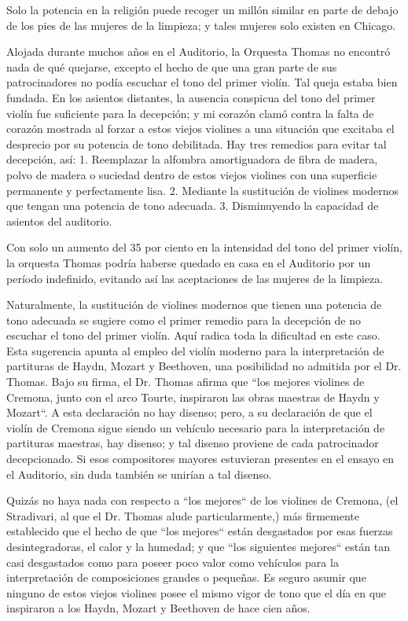 \documentclass[12pt]{book}
\begin{document}
Solo la potencia en la religión puede recoger un millón similar en parte de debajo de los pies de las mujeres de la limpieza; y tales mujeres solo existen en Chicago.

Alojada durante muchos años en el Auditorio, la Orquesta Thomas no encontró nada de qué quejarse, excepto el hecho de que una gran parte de sus patrocinadores no podía escuchar el tono del primer violín. Tal queja estaba bien fundada. En los asientos distantes, la ausencia conspicua del tono del primer violín fue suficiente para la decepción; y mi corazón clamó contra la falta de corazón mostrada al forzar a estos viejos violines a una situación que excitaba el desprecio por su potencia de tono debilitada. Hay tres remedios para evitar tal decepción, así: 1. Reemplazar la alfombra amortiguadora de fibra de madera, polvo de madera o suciedad dentro de estos viejos violines con una superficie permanente y perfectamente lisa. 2. Mediante la sustitución de violines modernos que tengan una potencia de tono adecuada. 3. Disminuyendo la capacidad de asientos del auditorio.

Con solo un aumento del 35 por ciento en la intensidad del tono del primer violín, la orquesta Thomas podría haberse quedado en casa en el Auditorio por un período indefinido, evitando así las aceptaciones de las mujeres de la limpieza.

Naturalmente, la sustitución de violines modernos que tienen una potencia de tono adecuada se sugiere como el primer remedio para la decepción de no escuchar el tono del primer violín. Aquí radica toda la dificultad en este caso. Esta sugerencia apunta al empleo del violín moderno para la interpretación de partituras de Haydn, Mozart y Beethoven, una posibilidad no admitida por el Dr. Thomas. Bajo su firma, el Dr. Thomas afirma que ``los mejores violines de Cremona, junto con el arco Tourte, inspiraron las obras maestras de Haydn y Mozart``. A esta declaración no hay disenso; pero, a su declaración de que el violín de Cremona sigue siendo un vehículo necesario para la interpretación de partituras maestras, hay disenso; y tal disenso proviene de cada patrocinador decepcionado. Si esos compositores mayores estuvieran presentes en el ensayo en el Auditorio, sin duda también se unirían a tal disenso.

Quizás no haya nada con respecto a ``los mejores`` de los violines de Cremona, (el Stradivari, al que el Dr. Thomas alude particularmente,) más firmemente establecido que el hecho de que ``los mejores`` están desgastados por esas fuerzas desintegradoras, el calor y la humedad; y que ``los siguientes mejores`` están tan casi desgastados como para poseer poco valor como vehículos para la interpretación de composiciones grandes o pequeñas. Es seguro asumir que ninguno de estos viejos violines posee el mismo vigor de tono que el día en que inspiraron a los Haydn, Mozart y Beethoven de hace cien años.
\end{document}
